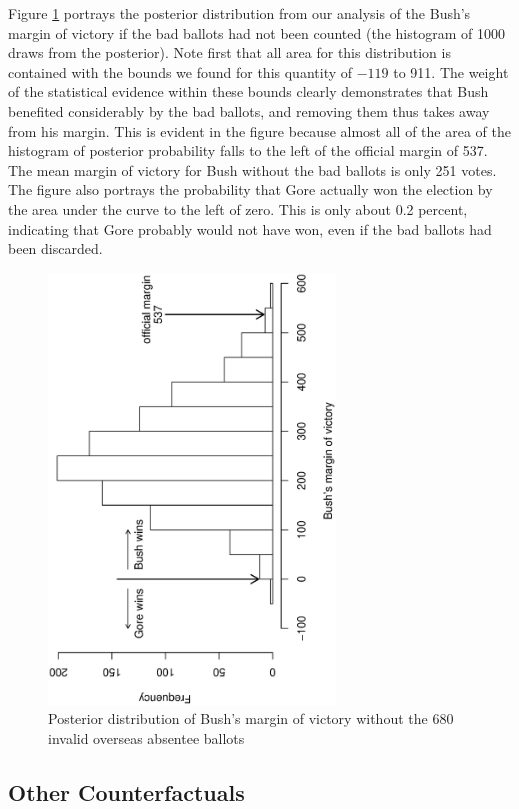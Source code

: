 \documentclass[11pt,titlepage]{article}
\begin{document}
Figure \ref{fg:margin} portrays the posterior distribution from our
analysis of the Bush's margin of victory if the bad ballots had not
been counted (the histogram of 1000 draws from the posterior).  Note
first that all area for this distribution is contained with the bounds
we found for this quantity of $-119$ to 911.  The weight of the
statistical evidence within these bounds clearly demonstrates that
Bush benefited considerably by the bad ballots, and removing them thus
takes away from his margin.  This is evident in the figure because
almost all of the area of the histogram of posterior probability falls
to the left of the official margin of 537.  The mean margin of victory
for Bush without the bad ballots is only 251 votes.  The figure also
portrays the probability that Gore actually won the election by the
area under the curve to the left of zero.  This is only about 0.2
percent, indicating that Gore probably would not have won, even if the
bad ballots had been discarded.
\begin{figure}[t]
\begin{center}
\includegraphics[width=3in,height=4.5in,angle=-90]{margin}
\caption{Posterior distribution of Bush's margin of victory without the
  680 invalid overseas absentee ballots} \label{fg:margin}
\end{center} 
\end{figure}

\subsection{Other Counterfactuals}
\end{document}
